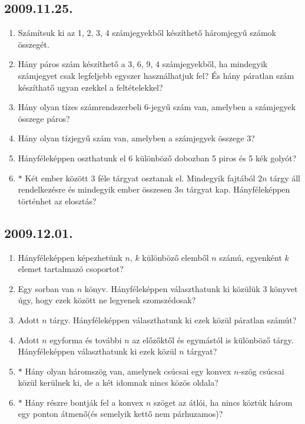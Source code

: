 \subsection*{2009.11.25.}
\begin{enumerate}
\item Számítsuk ki az 1, 2, 3, 4 számjegyekből készíthető háromjegyű számok összegét.
\item Hány páros szám készíthető a 3, 6, 9, 4 számjegyekből, ha mindegyik számjegyet csak legfeljebb egyszer használhatjuk fel? És hány páratlan szám készíthatő ugyan ezekkel a feltételekkel?
\item Hány olyan tízes számrendszerbeli 6-jegyű szám van, amelyben a számjegyek összege páros?
\item Hány olyan tízjegyű szám van, amelyben a számjegyek összege 3?
\item Hányféleképpen oszthatunk el 6 különböző dobozban 5 piros és 5 kék golyót?
\item $*$ Két ember között 3 féle tárgyat osztanak el. Mindegyik fajtából $2n$ tárgy áll rendelkezésre és mindegyik ember összesen $3n$ tárgyat kap. Hányféleképpen történhet az elosztás?
\end{enumerate}
\subsection*{2009.12.01.}
\begin{enumerate}
\item Hányféleképpen képezhetünk $n$, $k$ különböző elemből $n$ számú, egyenként $k$ elemet tartalmazó csoportot?
\item Egy sorban van $n$ könyv. Hányféleképpen választhatunk ki közülük 3 könyvet úgy, hogy ezek között ne legyenek szomszédosak?
\item Adott $n$ tárgy. Hányféleképpen választhatunk ki ezek közül páratlan számút?
\item Adott $n$ egyforma és további $n$ az előzőktől és egymástól is különböző tárgy. Hányféleképpen választhatunk ki ezek közül $n$ tárgyat?
\item $*$ Hány olyan háromszög van, amelynek csúcsai egy konvex $n$-szög csúcsai közül kerülnek ki, de a két idomnak nincs közös oldala?
\item $*$ Hány részre bontják fel a konvex $n$ szöget az átlói, ha nincs köztük három egy ponton átmenő(és semelyik kettő nem párhuzamos)?
\end{enumerate}

